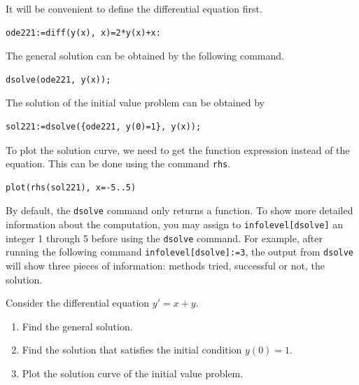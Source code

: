 \documentclass[
  12pt]{elegantbook}
\begin{document}
\begin{solution}

It will be convenient to define the differential equation first.

\begin{verbatim}
ode221:=diff(y(x), x)=2*y(x)+x:
\end{verbatim}

The general solution can be obtained by the following command.

\begin{verbatim}
dsolve(ode221, y(x));
\end{verbatim}

The solution of the initial value problem can be obtained by

\begin{verbatim}
sol221:=dsolve({ode221, y(0)=1}, y(x));
\end{verbatim}

To plot the solution curve, we need to get the function expression instead of the equation. This can be done using the command \texttt{rhs}.

\begin{verbatim}
plot(rhs(sol221), x=-5..5)
\end{verbatim}

\end{solution}

By default, the \texttt{dsolve} command only returns a function. To show more detailed information about the computation, you may assign to \texttt{infolevel{[}dsolve{]}} an integer 1 through 5 before using the \texttt{dsolve} command. For example, after running the following command \texttt{infolevel{[}dsolve{]}:=3}, the output from \texttt{dsolve} will show three pieces of information: methods tried, successful or not, the solution.

\begin{exercise}

Consider the differential equation
\(y'=x+y.\)

\begin{enumerate}
\def\labelenumi{\arabic{enumi}.}
\item
  Find the general solution.
\item
  Find the solution that satisfies the initial condition \(y(0)=1\).
\item
  Plot the solution curve of the initial value problem.
\end{enumerate}

\end{exercise}
\end{document}
